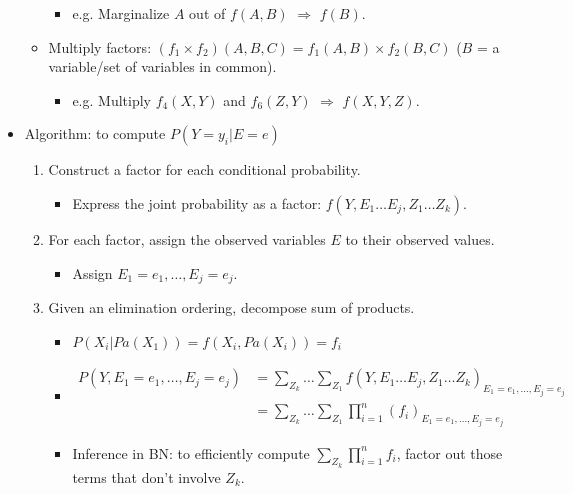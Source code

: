 \documentclass{article}
\begin{document}
\begin{itemize}
\begin{itemize}
                \begin{itemize}
                    \item e.g. Marginalize $A$ out of $f(A, B)$ $\Rightarrow$ $f(B)$.
                \end{itemize}
            \item Multiply factors: $(f_1 \times f_2)(A, B, C) = f_1(A, B) \times f_2(B, C)$ ($B$ = a variable/set of variables in common).
                \begin{itemize}
                    \item e.g. Multiply $f_4(X, Y)$ and $f_6(Z, Y)$ $\Rightarrow$ $f(X, Y, Z)$.
                \end{itemize}
        \end{itemize}
    \item Algorithm: to compute $P(Y=y_i|E=e)$
        \begin{enumerate}
            \item Construct a factor for each conditional probability.
                \begin{itemize}
                    \item Express the joint probability as a factor: $f(Y, E_1 \ldots E_j, Z_1 \ldots Z_k)$.
                \end{itemize}
            \item For each factor, assign the observed variables $E$ to their observed values.
                \begin{itemize}
                     \item Assign $E_1 = e_1, \ldots, E_j = e_j$.
                \end{itemize}
            \item Given an elimination ordering, decompose sum of products.
                \begin{itemize}
                    \item $P(X_i|Pa(X_1)) = f(X_i, Pa(X_i)) = f_i$
                    \item
                        \begin{align*}
                            P(Y, E_1 = e_1, \ldots, E_j = e_j) &= \sum\limits_{Z_k} \dots \sum\limits_{Z_1} f(Y, E_1 \ldots E_j, Z_1 \ldots Z_k)_{E_1 = e_1, \ldots, E_j = e_j} \\
                            &= \sum\limits_{Z_k} \dots \sum\limits_{Z_1} \prod\limits_{i=1}^{n} (f_i)_{E_1 = e_1, \ldots, E_j = e_j}
                        \end{align*}
                    \item Inference in BN: to efficiently compute $\sum\limits_{Z_k} \prod\limits_{i=1}^{n} f_i$, factor out those terms that don't involve $Z_k$.

\end{itemize}
\end{enumerate}
\end{itemize}
\end{document}

